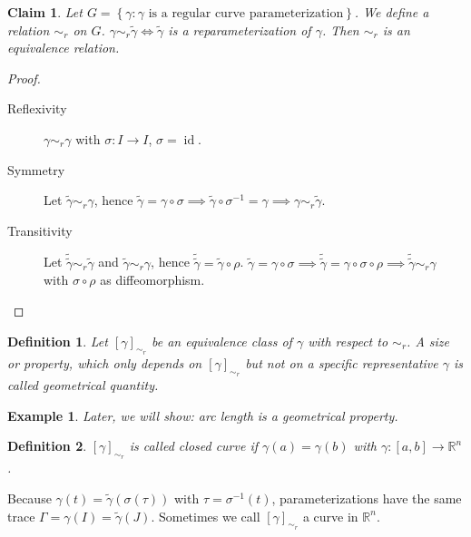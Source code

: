 \documentclass{article}
\newtheorem{example}{Example}  \numberwithin{example}{section}
\newtheorem{definition}{Definition}  \numberwithin{definition}{section}
\newtheorem*{claim}{Claim}%
\newcommand{\set}[1]{\left\{#1\right\}}
\begin{document}
\begin{claim}
  Let $G = \set{\gamma: \gamma \text{ is a regular curve parameterization}}$.
  We define a relation $\sim_{r}$ on $G$. $\gamma \sim_r \tilde\gamma \iff \tilde\gamma$ is a reparameterization of $\gamma$.
  Then $\sim_r$ is an equivalence relation.
\end{claim}
\begin{proof}
  \begin{description}
    \item[Reflexivity]
      $\gamma \sim_r \gamma$ with $\sigma: I \to I$, $\sigma = \operatorname{id}$. 
    \item[Symmetry]
      Let $\tilde\gamma \sim_r \gamma$, hence $\tilde\gamma = \gamma \circ \sigma \implies \tilde\gamma \circ \sigma^{-1} = \gamma \implies \gamma \sim_r \tilde\gamma$.
    \item[Transitivity]
      Let $\tilde{\tilde\gamma} \sim_r \tilde\gamma$ and $\tilde\gamma \sim_r \gamma$, hence $\tilde{\tilde\gamma} = \tilde\gamma \circ \rho$.
      $\tilde\gamma = \gamma \circ \sigma \implies \tilde{\tilde\gamma} = \gamma \circ \sigma \circ \rho \implies \tilde{\tilde\gamma} \sim_r \gamma$ with $\sigma \circ \rho$ as diffeomorphism.
  \end{description}
\end{proof}

\begin{definition}
  Let $[\gamma]_{\sim_r}$ be an equivalence class of $\gamma$ with respect to $\sim_r$. A size or property, which only depends on $[\gamma]_{\sim_r}$ but not on a specific representative $\gamma$ is called \emph{geometrical quantity}.
\end{definition}

\begin{example}
  Later, we will show: arc length is a geometrical property.
\end{example}

\begin{definition}
  $[\gamma]_{\sim_r}$ is called \emph{closed curve} if $\gamma(a) = \gamma(b)$ with $\gamma: [a,b] \to \mathbb R^n$.
\end{definition}

Because $\gamma(t) = \tilde{\gamma}(\sigma(\tau))$ with $\tau = \sigma^{-1}(t)$, parameterizations have the same trace $\Gamma = \gamma(I) = \tilde\gamma(J)$. Sometimes we call $[\gamma]_{\sim_r}$ a curve in $\mathbb R^n$.
\end{document}
